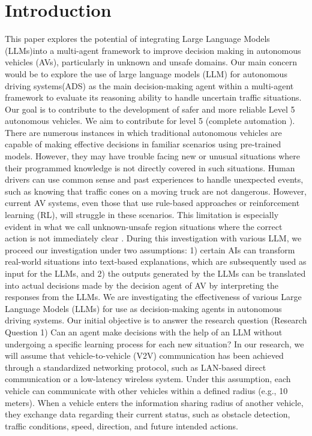 \documentclass[conference]{IEEEtran}
\begin{document}
\IEEEpeerreviewmaketitle



\section{Introduction}

This paper explores the potential of integrating Large Language Models (LLMs)\cite{chang2024survey}into a multi-agent framework to improve decision making in autonomous vehicles (AVs), particularly in unknown and unsafe domains.
Our main concern would be to explore the use of large language models (LLM) for autonomous driving systems(ADS) as the main decision-making agent within a multi-agent framework to evaluate its reasoning ability to handle uncertain traffic situations. Our goal is to contribute to the development of safer and more reliable Level 5\cite{cho2020more} autonomous vehicles. We aim to contribute for level 5 (complete automation \cite{raza2018autonomous}). There are numerous instances in which traditional autonomous vehicles are capable of making effective decisions in familiar scenarios using pre-trained models.  However, they may have trouble facing new or unusual situations where their programmed knowledge is not directly covered in such situations. Human drivers can use common sense and past experiences to handle unexpected events, such as knowing that traffic cones on a moving truck are not dangerous. However, current AV systems, even those that use rule-based approaches or reinforcement learning (RL\cite{kaelbling1996reinforcement}), will struggle in these scenarios. This limitation is especially evident in what we call unknown-unsafe region situations where the correct action is not immediately clear \cite{fu2024drive}.
During this investigation with various LLM, we proceed our investigation under two assumptions: 1) certain AIs can transform real-world situations into text-based explanations, which are subsequently used as input for the LLMs, and 2) the outputs generated by the LLMs can be translated into actual decisions made by the decision agent of AV by interpreting the responses from the LLMs. We are investigating the effectiveness of various Large Language Models (LLMs) for use as decision-making agents in autonomous driving systems. Our initial objective is to answer the research question (Research Question 1) Can an agent make decisions with the help of an LLM without undergoing a specific learning process for each new situation?
In our research, we will assume that vehicle-to-vehicle (V2V) communication has been achieved through a standardized networking protocol, such as LAN-based direct communication or a low-latency wireless system. Under this assumption, each vehicle can communicate with other vehicles within a defined radius (e.g., 10 meters). When a vehicle enters the information sharing radius of another vehicle, they exchange data regarding their current status, such as obstacle detection, traffic conditions, speed, direction, and future intended actions.
\end{document}
